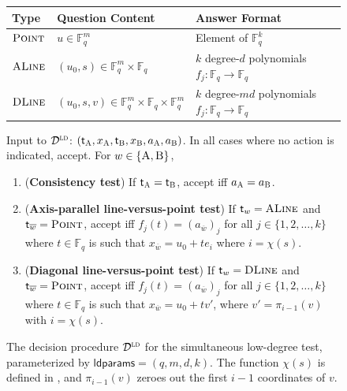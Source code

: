 \documentclass[11pt]{article}
\theoremstyle{definition}
\newcommand{\F}{\ensuremath{\mathbb{F}}}
\newcommand{\ld}{\textsc{ld}}
\newcommand{\decider}{\mathcal{D}}
\newcommand{\labelstyle}[1]{\ensuremath{\textsc{#1}}\xspace}
\newcommand{\tvarstyle}[1]{\mathsf{#1}}
\newcommand{\tvar}{\ensuremath{\tvarstyle{t}}}
\newcommand{\alice}{\labelstyle{A}}
\newcommand{\bob}{\labelstyle{B}}
\newcommand{\typestyle}[1]{\ensuremath{\textsc{#1}}\xspace}
\newcommand{\Point}{\typestyle{Point}}
\newcommand{\ALine}{\typestyle{ALine}}
\newcommand{\DLine}{\typestyle{DLine}}
\newcommand{\AB}{\{\alice, \bob\}}
\newcommand{\ldc}{k}
\newcommand{\ldparams}{\mathsf{ldparams}}
\newenvironment{gamespec}{
  \begin{mdframed}[style=figstyle]}{
  \end{mdframed}}
\begin{document}
\begin{figure}[!htbp]
  \centering
  \begin{gamespec}
    \setlength{\tabcolsep}{1em}
    \begin{tabularx}{\textwidth}{ l   l   X   }
      \toprule
      Type & Question Content & Answer Format \\
      \midrule
      $\Point$ & $ u \in \F_q^m$ & Element of $\F_q^\ldc$  \\
      $\ALine$ & $ (u_0, s) \in \F_q^m \times \F_q$ &
      $\ldc$ degree-$d$ polynomials $f_j: \F_q \to \F_q$\\
      $\DLine$ & $(u_0, s, v) \in \F_q^m \times \F_q \times \F_q^m$ & 
      $\ldc$ degree-$md$ polynomials $f_j: \F_q \to \F_q$\\
      \bottomrule
    \end{tabularx}

    \vspace{1em}

    Input to $\decider^\ld$: $(\tvar_\alice,x_\alice, \tvar_\bob, x_\bob,
    a_\alice, a_\bob)$.
    In all cases where no action is indicated, accept.
    For $w \in \AB$,

    \begin{enumerate}
      \setlength\itemsep{1pt}
    \item (\textbf{Consistency test}) If $\tvar_\alice = \tvar_\bob$, accept iff
      $a_\alice = a_\bob$.
    \item (\textbf{Axis-parallel line-versus-point test}) If $\tvar_w = \ALine$
      and $\tvar_{\overline{w}} = \Point$, accept iff $f_j(t) =
      (a_{\overline{w}})_j$ for all $j \in \{1,2,\ldots,\ldc\}$ where $t \in
      \F_q$ is such that $x_{\overline{w}} = u_0 + te_i$ where $i = \chi(s)$.
      
    \item (\textbf{Diagonal line-versus-point test}) If $\tvar_w = \DLine$ and
      $\tvar_{\overline{w}} = \Point$, accept iff $f_j(t) =
      (a_{\overline{w}})_j$ for all $j \in \{1,2,\ldots,\ldc\}$ where $t \in
      \F_q$ is such that $x_{\overline{w}} = u_0 + tv'$, where $v' =
      \pi_{i-1}(v)$ with $i = \chi(s)$.
    \end{enumerate}
  \end{gamespec}
  \caption{The decision procedure $\decider^\ld$ for the simultaneous low-degree
    test, parameterized by $\ldparams = (q,m,d,\ldc)$.
    The function $\chi(s)$ is defined in , and $\pi_{i-1}(v)$
    zeroes out the first $i-1$ coordinates of $v$.}
  \label{fig:ld-decider}
\end{figure}
\end{document}
